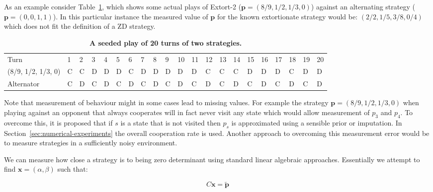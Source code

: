 \documentclass[10pt,letterpaper]{article}
\newlength\savedwidth
\newcommand\thickhline{\noalign{\global\savedwidth\arrayrulewidth\global\arrayrulewidth 2pt}%
\hline
\noalign{\global\arrayrulewidth\savedwidth}}
\begin{document}
As an example consider Table~\ref{tab:actual_plays_of_ZDextort-2}, which shows
some actual plays of Extort-2 (\(\textbf{p}=(8 / 9, 1 / 2, 1 / 3, 0)\)) against an
alternating strategy (\(\textbf{p}=(0, 0, 1, 1)\)). In this particular instance the
measured value of \(\textbf{p}\) for the known extortionate strategy would be:
\((2/2, 1/5, 3/8, 0/4)\) which does not fit the definition of a ZD strategy.


\begin{table}[!ht]
    \begin{adjustwidth}{-2.25in}{0in} %
    \centering
    \caption{
        {\bf A seeded play of 20 turns of two strategies.}}
    \label{tab:actual_plays_of_ZDextort-2}
        \begin{tabular}{lllllllllllllllllllll}
            \hline
            Turn               &  1 &  2 &  3 &  4 &  5 &  6 &  7 &  8 &  9 & 10 &  11 &  12 &  13 &  14 &  15 &  16 &  17 &  18 &  19 &  20 \\ \thickhline
            (8/9, 1/2, 1/3, 0) &  C &  C &  D &  D &  D &  C &  D &  D &  D & D &   D &   C &   C &   C &   D &   D &   D &   C &   D &   D \\ \hline
            Alternator         &  C &  D &  C &  D &  C &  D &  C &  D &  C & D &   C &   D &   C &   D &   C &   D &   C &   D &   C &   D \\\hline
        \end{tabular}
    \end{adjustwidth}
\end{table}


Note that measurement of behaviour might in some cases lead to missing values.
For example the strategy \(\textbf{p}=(8 / 9, 1 / 2, 1 / 3, 0)\) when playing against an
opponent that always cooperates will in fact never visit any state which would allow measurement
of \(p_3\) and \(p_4\). To overcome this, it is proposed that if \(s\) is a state
that is not visited then \(p_s\) is approximated using a sensible prior or
imputation. In Section~\ref{sec:numerical-experiments} the overall cooperation
rate is used. Another approach to overcoming this measurement error would be to
measure strategies in a sufficiently noisy environment.

We can measure how close a strategy is to being zero determinant using standard
linear algebraic approaches. Essentially we attempt to find \(\textbf{x}=(\alpha,
\beta)\) such that:

\begin{equation}\label{eqn:linear_algebraic_equation_for_p}
    C\textbf{x}= \tilde{\textbf{p}}
\end{equation}
\end{document}

